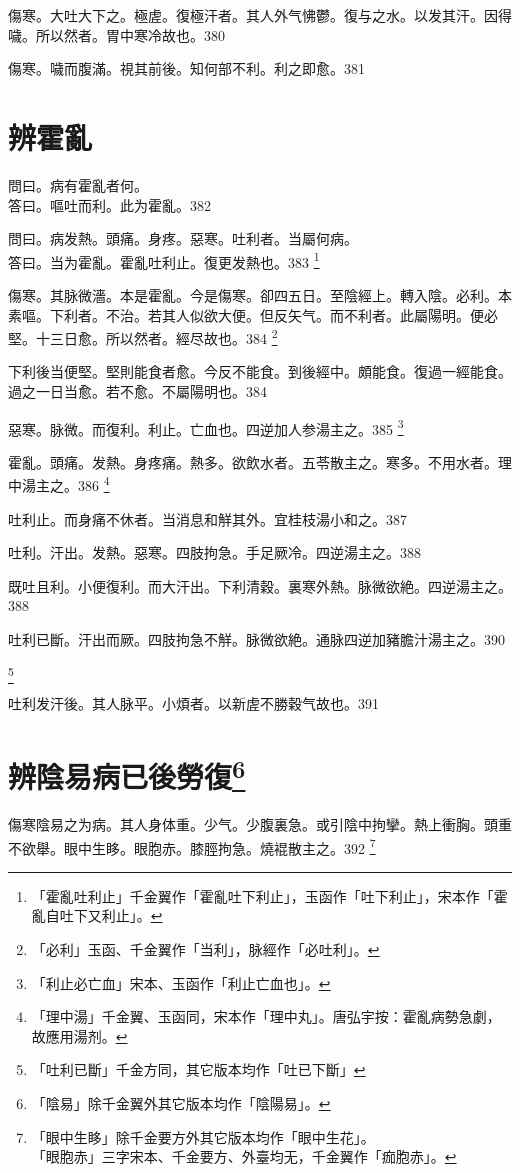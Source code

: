 \documentclass[12pt,twoside,UTF8,b5paper]{ctexbook}
\begin{document}
傷寒。大吐大下之。極虗。復極汗者。其人外气怫鬱。復与之水。以发其汗。因得噦。所以然者。胃中寒冷故也。380

傷寒。噦而腹滿。視其前後。知何部不利。利之即愈。381

\chapter{辨霍亂}

問曰。病有霍亂者何。\\
答曰。嘔吐而利。此为霍亂。382

問曰。病发熱。頭痛。身疼。惡寒。吐利者。当屬何病。\\
答曰。当为霍亂。霍亂吐利止。復更发熱也。383
	\footnote{「霍亂吐利止」千金翼作「霍亂吐下利止」，玉函作「吐下利止」，宋本作「霍亂自吐下又利止」。}

傷寒。其脉微濇。本是霍亂。今是傷寒。卻四五日。至陰經上。轉入陰。必利。本素嘔。下利者。不治。若其人似欲大便。但反矢气。而不利者。此屬陽明。便必堅。十三日愈。所以然者。經尽故也。384
	\footnote{「必利」玉函、千金翼作「当利」，脉經作「必吐利」。}

下利後当便堅。堅則能食者愈。今反不能食。到後經中。頗能食。復過一經能食。過之一日当愈。若不愈。不屬陽明也。384

惡寒。脉微。而復利。利止。亡血也。四逆加人参湯主之。385
	\footnote{「利止必亡血」宋本、玉函作「利止亡血也」。}

霍亂。頭痛。发熱。身疼痛。熱多。欲飲水者。五苓散主之。寒多。不用水者。理中湯主之。386
	\footnote{「理中湯」千金翼、玉函同，宋本作「理中丸」。唐弘宇按：霍亂病勢急劇，故應用湯剂。}

吐利止。而身痛不休者。当消息和觧其外。宜桂枝湯小和之。387

吐利。汗出。发熱。惡寒。四肢拘急。手足厥冷。四逆湯主之。388

既吐且利。小便復利。而大汗出。下利清穀。裏寒外熱。脉微欲絶。四逆湯主之。388

吐利已斷。汗出而厥。四肢拘急不觧。脉微欲絶。通脉四逆加豬膽汁湯主之。390

	\footnote{「吐利已斷」千金方同，其它版本均作「吐已下斷」}

吐利发汗後。其人脉平。小煩者。以新虗不勝穀气故也。391

\chapter{辨陰易病已後勞復\footnote{「陰易」除千金翼外其它版本均作「陰陽易」。}}

傷寒陰易之为病。其人身体重。少气。少腹裏急。或引陰中拘攣。熱上衝胸。頭重不欲舉。眼中生眵。{眼胞赤。}膝脛拘急。燒裩散主之。392
	\footnote{「眼中生眵」除千金要方外其它版本均作「眼中生花」。\\「眼胞赤」三字宋本、千金要方、外臺均无，千金翼作「痂胞赤」。}
\end{document}
